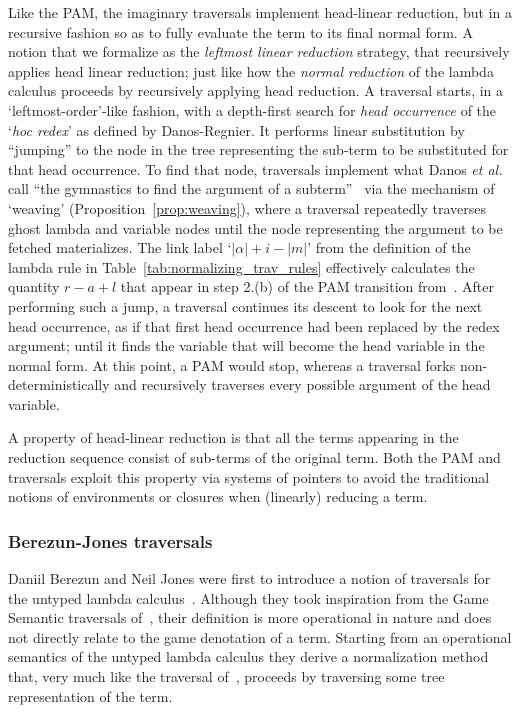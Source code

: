 \documentclass{elsarticle}
\makeatletter
\theoremstyle{plain}
\theoremstyle{definition}
\def\etal{\textit{et al.}\@\xspace}
\makeatother
\begin{document}
Like the PAM, the imaginary traversals implement head-linear reduction, but in a recursive fashion so as to fully evaluate the term to its final normal form.
A notion that we formalize as the \emph{leftmost linear reduction} strategy, that recursively applies head linear reduction; just like how the \emph{normal reduction} of the lambda calculus proceeds by recursively applying head reduction.
A traversal starts, in a `leftmost-order'-like fashion, with a depth-first search for \emph{head occurrence} of the `\emph{hoc redex}' as defined by Danos-Regnier. It performs linear substitution by ``jumping'' to the node in the tree representing the sub-term to be substituted for that head occurrence.
To find that node, traversals implement what Danos \etal call ``the gymnastics to find the argument of a subterm''~\cite{danos-head} via the mechanism of `weaving' (Proposition~\ref{prop:weaving}),
where a traversal repeatedly traverses ghost lambda and variable nodes until the node representing the argument to be fetched materializes.
The link label `$|\alpha|+i-|m|$' from the definition
of the lambda rule in Table~\ref{tab:normalizing_trav_rules} effectively calculates the quantity $r-a+l$ that appear in step 2.(b) of the PAM transition from~\cite{danos-head}.
After performing such a jump, a traversal continues its descent to look for the next head occurrence, as if that first head occurrence had been replaced by the redex argument; until it finds the variable that will become the head variable in the normal form. At this point, a PAM would stop, whereas a traversal forks  non-deterministically and recursively traverses every possible argument of the head variable.

A property of head-linear reduction is that all the terms appearing in the reduction sequence consist of sub-terms of the original term.
Both the PAM and traversals exploit this property via systems of pointers to avoid the traditional notions of environments or closures when (linearly) reducing a term.

\subsubsection{Berezun-Jones traversals}

Daniil Berezun and Neil Jones were first to introduce a notion of traversals for the untyped lambda calculus~\cite{JonesBerezunLLL-PEPM17}.
Although they took inspiration from the Game Semantic traversals of~\cite{OngLics2006,BlumGalop2008}, their definition is more operational in nature and does not directly relate to the game denotation of a term. Starting from an operational semantics of the untyped lambda calculus they derive a normalization method that, very much like the traversal of~\cite{OngLics2006, BlumPhd}, proceeds by traversing some tree representation of the term.
\end{document}
